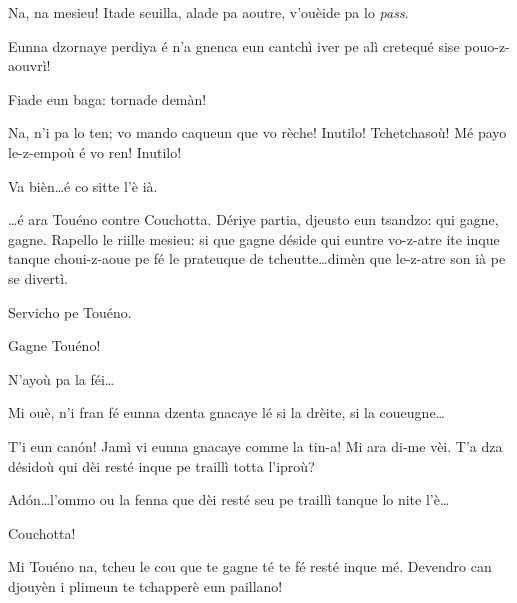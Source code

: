 \begin{drama}

\Sandrinospeaks Na, na mesieu! Itade seuilla, alade pa aoutre, v'ouèide pa lo \textit{pass}. 

\Genespeaks Eunna dzornaye perdiya é n'a gnenca eun cantchì iver pe alì cretequé sise pouo-z-aouvrì! 

\Sandrinospeaks Fiade eun baga: tornade demàn!

\Genespeaks Na, n'i pa lo ten; vo mando caqueun que vo rèche! Inutilo! Tche\-tchasoù! Mé payo le-z-empoù é vo ren! Inutilo!


\Sandrinospeaks Va bièn\ldots é co sitte l'è ià.




\Treisouspeaks \ldots é ara Touéno contre Couchotta. Dériye partia, djeusto eun tsandzo: qui gagne, gagne. Rapello le riille mesieu: si que gagne déside qui euntre vo-z-atre ite inque tanque choui-z-aoue pe fé le prateuque de tcheutte\ldots dimèn que le-z-atre son ià pe se divertì.


\Treisouspeaks Servicho pe Touéno.


\Treisouspeaks Gagne Touéno!

\Treisouspeaks{} N’ayoù pa la féi\ldots

\Tuenospeaks Mi ouè, n'i fran fé eunna dzenta gnacaye lé si la drèite, si la coueugne\ldots

\Treisouspeaks T'i eun can\'on! Jamì vi eunna gnacaye comme la tin-a! Mi ara di-me vèi. T'a dza désidoù qui dèi resté inque pe traillì totta l'iproù?

\Tuenospeaks Ad\'on\ldots l'ommo ou la fenna que dèi resté seu pe traillì tanque lo nite l'è\ldots 


\Tuenospeaks{} Couchotta!

\Gerominespeaks Mi Touéno na, tcheu le cou que te gagne té te fé resté inque mé. Devendro can djouyèn i plimeun te tchapperè eun paillano!


\end{drama}
